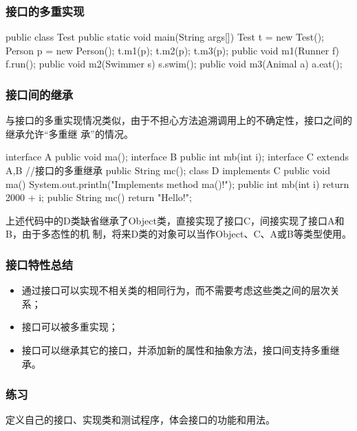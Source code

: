 \documentclass[compress,table]{beamer} %
\def\Mage{\color{magenta}}
\begin{document}
\begin{frame}[fragile] %
\frametitle{接口的多重实现}
\begin{javaCode}
public class Test {
  public static void main(String args[]) {
    Test t = new Test();
    Person p = new Person();
    t.m1(p);
    t.m2(p);
    t.m3(p);
  }
  public void m1(Runner f) {
    f.run();
  }
  public void m2(Swimmer s) {
    s.swim();
  }
  public void m3(Animal a) {
    a.eat();
  }
}
\end{javaCode}
\end{frame}

\begin{frame}[fragile] %
\frametitle{接口间的继承}

与接口的多重实现情况类似，由于不担心方法追溯调用上的不确定性，接口之间的继承允许“多重继
承”的情况。
\begin{javaCode}
interface A {
  public void ma();
}
interface B {
  public int mb(int i);
}
interface C extends A,B {  //接口的多重继承
  public String mc();
}
class D implements C {
  public void ma() {
    System.out.println("Implements method ma()!");
  }
  public int mb(int i) {
    return 2000 + i;
  }
  public String mc() {
    return "Hello!";
  }
}
\end{javaCode}
{\footnotesize \Mage 上述代码中的D类缺省继承了Object类，直接实现了接口C，间接实现了接口A和B，由于多态性的机
制，将来D类的对象可以当作Object、C、A或B等类型使用。}
\end{frame}

\begin{frame}[fragile] %
\frametitle{接口特性总结}
\begin{itemize}
\item 通过接口可以实现不相关类的相同行为，而不需要考虑这些类之间的层次关系；
\item 接口可以被多重实现；
\item 接口可以继承其它的接口，并添加新的属性和抽象方法，接口间支持多重继承。
\end{itemize}
\end{frame}

\begin{frame}[fragile] %
\frametitle{练习}
定义自己的接口、实现类和测试程序，体会接口的功能和用法。
\end{frame}

\end{document}
